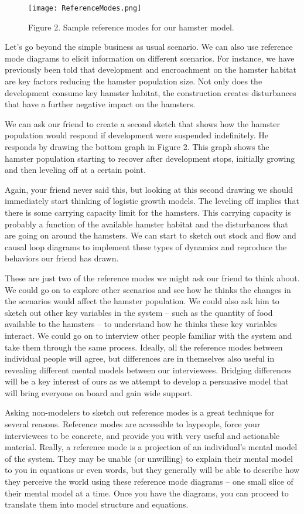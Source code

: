 \documentclass[]{memoir}
\let\Oldincludegraphics\includegraphics
\renewcommand{\includegraphics}[1]{\Oldincludegraphics[max size={\textwidth}{\textheight}]{#1}}
\begin{document}
\begin{figure}[htbp]
\centering
\texttt{[image: ReferenceModes.png]}
\caption{Figure 2. Sample reference modes for our hamster model.}
\end{figure}

Let's go beyond the simple business as usual scenario. We can also use
reference mode diagrams to elicit information on different scenarios.
For instance, we have previously been told that development and
encroachment on the hamster habitat are key factors reducing the hamster
population size. Not only does the development consume key hamster
habitat, the construction creates disturbances that have a further
negative impact on the hamsters.

We can ask our friend to create a second sketch that shows how the
hamster population would respond if development were suspended
indefinitely. He responds by drawing the bottom graph in Figure 2. This
graph shows the hamster population starting to recover after development
stops, initially growing and then leveling off at a certain point.

Again, your friend never said this, but looking at this second drawing
we should immediately start thinking of logistic growth models. The
leveling off implies that there is some carrying capacity limit for the
hamsters. This carrying capacity is probably a function of the available
hamster habitat and the disturbances that are going on around the
hamsters. We can start to sketch out stock and flow and causal loop
diagrams to implement these types of dynamics and reproduce the
behaviors our friend has drawn.

These are just two of the reference modes we might ask our friend to
think about. We could go on to explore other scenarios and see how he
thinks the changes in the scenarios would affect the hamster population.
We could also ask him to sketch out other key variables in the system --
such as the quantity of food available to the hamsters -- to understand
how he thinks these key variables interact. We could go on to interview
other people familiar with the system and take them through the same
process. Ideally, all the reference modes between individual people will
agree, but differences are in themselves also useful in revealing
different mental models between our interviewees. Bridging differences
will be a key interest of ours as we attempt to develop a persuasive
model that will bring everyone on board and gain wide support.

Asking non-modelers to sketch out reference modes is a great technique
for several reasons. Reference modes are accessible to laypeople, force
your interviewees to be concrete, and provide you with very useful and
actionable material. Really, a reference mode is a projection of an
individual's mental model of the system. They may be unable (or
unwilling) to explain their mental model to you in equations or even
words, but they generally will be able to describe how they perceive the
world using these reference mode diagrams -- one small slice of their
mental model at a time. Once you have the diagrams, you can proceed to
translate them into model structure and equations.
\end{document}
